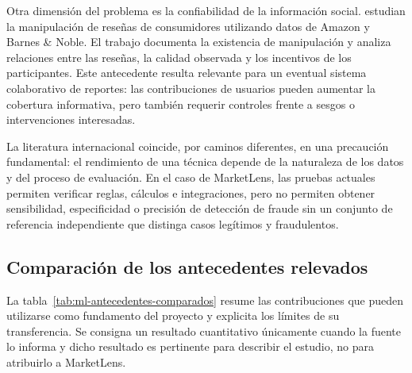 Otra dimensión del problema es la confiabilidad de la información social. \textcite{ml-hu-2011} estudian la manipulación de reseñas de consumidores utilizando datos de Amazon y Barnes \& Noble. El trabajo documenta la existencia de manipulación y analiza relaciones entre las reseñas, la calidad observada y los incentivos de los participantes. Este antecedente resulta relevante para un eventual sistema colaborativo de reportes: las contribuciones de usuarios pueden aumentar la cobertura informativa, pero también requerir controles frente a sesgos o intervenciones interesadas.

La literatura internacional coincide, por caminos diferentes, en una precaución fundamental: el rendimiento de una técnica depende de la naturaleza de los datos y del proceso de evaluación. En el caso de MarketLens, las pruebas actuales permiten verificar reglas, cálculos e integraciones, pero no permiten obtener sensibilidad, especificidad o precisión de detección de fraude sin un conjunto de referencia independiente que distinga casos legítimos y fraudulentos.

\subsection{Comparación de los antecedentes relevados}\label{subsec:ml-comparativa-antecedentes}

La tabla~\ref{tab:ml-antecedentes-comparados} resume las contribuciones que pueden utilizarse como fundamento del proyecto y explicita los límites de su transferencia. Se consigna un resultado cuantitativo únicamente cuando la fuente lo informa y dicho resultado es pertinente para describir el estudio, no para atribuirlo a MarketLens.

